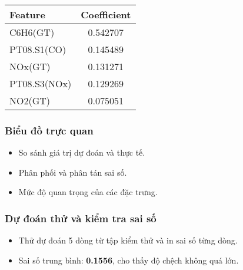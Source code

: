 \begin{center}
\begin{tabular}{|l|c|}
\hline
\textbf{Feature} & \textbf{Coefficient} \\
\hline
C6H6(GT) & 0.542707 \\
PT08.S1(CO) & 0.145489 \\
NOx(GT) & 0.131271 \\
PT08.S3(NOx) & 0.129269 \\
NO2(GT) & 0.075051 \\
\hline
\end{tabular}
\end{center}

\subsubsection{Biểu đồ trực quan}
\begin{itemize}
    \item So sánh giá trị dự đoán và thực tế.
    \item Phân phối và phân tán sai số.
    \item Mức độ quan trọng của các đặc trưng.
\end{itemize}

\subsubsection{Dự đoán thử và kiểm tra sai số}
\begin{itemize}
    \item Thử dự đoán 5 dòng từ tập kiểm thử và in sai số từng dòng.
    \item Sai số trung bình: \textbf{0.1556}, cho thấy độ chệch không quá lớn.
\end{itemize}
